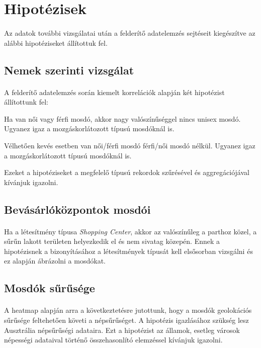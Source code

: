 	\section{Hipotézisek}
	\paragraph{}
	Az adatok további vizsgálatai után a felderítő adatelemzés sejtéseit kiegészítve az alábbi hipotéziseket állítottuk fel. 
	\subsection{Nemek szerinti vizsgálat}
	\paragraph{}
	A felderítő adatelemzés során kiemelt korrelációk alapján két hipotézist állítottunk fel:
	\begin{compactlist}			
		\item Ha van női vagy férfi mosdó, akkor nagy valószínűséggel nincs unisex mosdó. Ugyanez igaz a mozgáskorlátozott típusú mosdóknál is.
		\item Vélhetően kevés esetben van női/férfi mosdó férfi/női mosdó nélkül. Ugyanez igaz a mozgáskorlátozott típusú mosdóknál is.
	\end{compactlist}
	Ezeket a hipotéziseket a megfelelő típusú rekordok szűrésével és aggregációjával kívánjuk igazolni.\par
	\subsection{Bevásárlóközpontok mosdói}
	\paragraph{}
	Ha a létesítmény típusa \textit{Shopping Center}, akkor az valószínűleg a parthoz közel, a sűrűn lakott területen helyezkedik el és nem sivatag közepén. Ennek a hipotézisnek a bizonyításához a létesítmények típusát kell elsősorban vizsgálni és ez alapján ábrázolni a mosdókat.	
	\subsection{Mosdók sűrűsége}
	\paragraph{}
	A heatmap alapján arra a következtetésre jutottunk, hogy a mosdók geolokációs sűrűsége feltehetően követi a népsűrűséget. A hipotézis igazlásához szükség lesz Ausztrália népsűrűségi adataira. Ezt a hipotézist az államok, esetleg városok népességi adataival történő összehasonlító elemzéssel kívánjuk igazolni.
